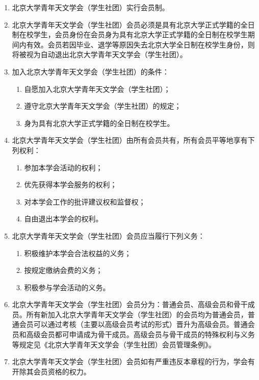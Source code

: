 \begin{enumerate}[resume]
    \item 北京大学青年天文学会（学生社团）实行会员制。
    
    \item 北京大学青年天文学会（学生社团）会员必须是具有北京大学正式学籍的全日制在校学生，会员身份在会员身为具有北京大学正式学籍的全日制在校学生期间内有效。会员若因毕业、退学等原因失去北京大学全日制在校学生身份，则将被视为自动退出北京大学青年天文学会（学生社团）。
    
    \item 加入北京大学青年天文学会（学生社团）的条件：
    
    \begin{enumerate}
        \item 自愿加入北京大学青年天文学会（学生社团）；
        \item 遵守北京大学青年天文学会（学生社团）的规定；
        \item 身为具有北京大学正式学籍的全日制在校学生。
    \end{enumerate} %
    
    \item 北京大学青年天文学会（学生社团）由所有会员共有，所有会员平等地享有下列权利：
    
    \begin{enumerate}
        \item 参加本学会活动的权利；
        \item 优先获得本学会服务的权利；
        \item 对本学会工作的批评建议权和监督权；
        \item 自由退出本学会的权利。
    \end{enumerate}
    
    \item 北京大学青年天文学会（学生社团）会员应当履行下列义务：
    
    \begin{enumerate}
        \item 积极维护本学会合法权益的义务；
        \item 按规定缴纳会费的义务；
        \item 积极参与学会活动的义务。
    \end{enumerate}
    
    \item 北京大学青年天文学会（学生社团）会员分为：普通会员、高级会员和骨干成员。所有新加入北京大学青年天文学会（学生社团）的会员均为普通会员，普通会员可以通过考核（主要以高级会员考试的形式）晋升为高级会员。普通会员和高级会员都可申请成为骨干成员。高级会员与骨干成员的特殊权利与义务等规定见《北京大学青年天文学会（学生社团）会员管理条例》。
    
    \item 北京大学青年天文学会（学生社团）会员如有严重违反本章程的行为，学会有开除其会员资格的权力。 
\end{enumerate}

